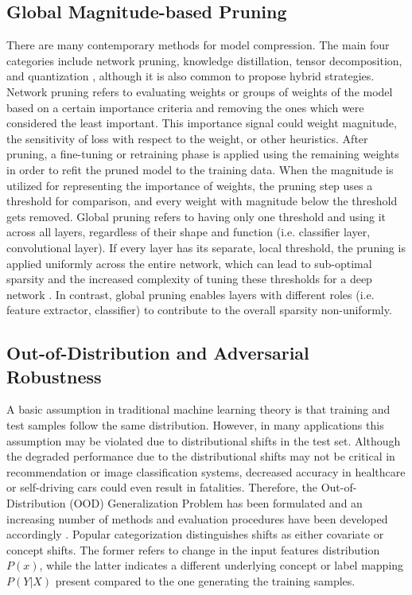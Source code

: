 \subsection{Global Magnitude-based Pruning}\label{subsec:prune}

There are many contemporary methods for model compression. The main four categories include network pruning, knowledge distillation, tensor decomposition,
and quantization \cite{survey}, although it is also common to propose hybrid strategies. Network pruning refers to evaluating weights or groups of weights
of the model based on a certain importance criteria and removing the ones which were considered the least important. This importance signal could weight
magnitude, the sensitivity of loss with respect to the weight, or other heuristics. After pruning, a fine-tuning or retraining phase is applied using the 
remaining weights in order to refit the pruned model to the training data.
When the magnitude is utilized for representing the importance of weights, the pruning step uses a threshold for comparison, and every weight with magnitude
below the threshold gets removed. Global pruning refers to having only one threshold and using it across all layers, regardless of their shape and function
(i.e. classifier layer, convolutional layer). If every layer has its separate, local threshold, the pruning is applied uniformly across the entire network,
which can lead to sub-optimal sparsity and the increased complexity of tuning these thresholds for a deep network \cite{pruning_survey24}. In contrast, 
global pruning enables layers with different roles (i.e. feature extractor, classifier) to contribute to the overall sparsity non-uniformly.


\subsection{Out-of-Distribution and Adversarial Robustness}\label{subsec:ood&adv}

A basic assumption in traditional machine learning theory is that training and test samples follow the same distribution. However, in many applications this
assumption may be violated due to distributional shifts in the test set. Although the degraded performance due to the distributional shifts may not be critical
in recommendation or image classification systems, decreased accuracy in healthcare or self-driving cars could even result in fatalities.
Therefore, the Out-of-Distribution (OOD) Generalization Problem has
been formulated and an increasing number of methods and evaluation procedures have been developed accordingly \cite{oodgeneralization}. Popular categorization
distinguishes shifts as either covariate or concept shifts. The former refers to change in the input features distribution $ P(x) $, while the latter indicates
a different underlying concept or label mapping $P(Y | X)$ present compared to the one generating the training samples.

